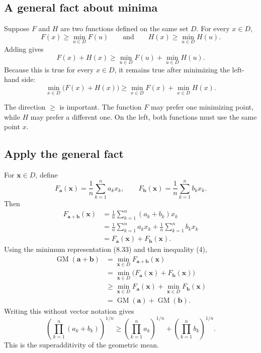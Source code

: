 \documentclass[11pt]{article}
\newcommand{\GM}{\operatorname{GM}}
\begin{document}
\subsection{A general fact about minima}

Suppose $F$ and $H$ are two functions defined on the same set $D$.  For every
$x\in D$,
\[
 F(x)\ge\min_{u\in D}F(u)
 \qquad\text{and}\qquad
 H(x)\ge\min_{u\in D}H(u).
\]
Adding gives
\[
 F(x)+H(x)
 \ge
 \min_{u\in D}F(u)+\min_{u\in D}H(u).
\]
Because this is true for every $x\in D$, it remains true after minimizing the
left-hand side:
\begin{equation*}
\boxed{
 \min_{x\in D}\bigl(F(x)+H(x)\bigr)
 \ge
 \min_{x\in D}F(x)+\min_{x\in D}H(x).
}
\tag{4}
\end{equation*}

The direction $\ge$ is important.  The function $F$ may prefer one minimizing
point, while $H$ may prefer a different one.  On the left, both functions must
use the same point $x$.

\subsection{Apply the general fact}

For $\mathbf x\in D$, define
\[
 F_{\mathbf a}(\mathbf x)
 =\frac1n\sum_{k=1}^{n}a_kx_k,
 \qquad
 F_{\mathbf b}(\mathbf x)
 =\frac1n\sum_{k=1}^{n}b_kx_k.
\]
Then
\begin{align*}
 F_{\mathbf a+\mathbf b}(\mathbf x)
 &=\frac1n\sum_{k=1}^{n}(a_k+b_k)x_k\\
 &=\frac1n\sum_{k=1}^{n}a_kx_k
   +\frac1n\sum_{k=1}^{n}b_kx_k\\
 &=F_{\mathbf a}(\mathbf x)+F_{\mathbf b}(\mathbf x).
\end{align*}
Using the minimum representation (8.33) and then inequality (4),
\begin{align*}
 \GM(\mathbf a+\mathbf b)
 &=\min_{\mathbf x\in D}
   F_{\mathbf a+\mathbf b}(\mathbf x)\\
 &=\min_{\mathbf x\in D}
   \bigl(F_{\mathbf a}(\mathbf x)+F_{\mathbf b}(\mathbf x)\bigr)\\
 &\ge
   \min_{\mathbf x\in D}F_{\mathbf a}(\mathbf x)
   +
   \min_{\mathbf x\in D}F_{\mathbf b}(\mathbf x)\\
 &=\GM(\mathbf a)+\GM(\mathbf b).
\end{align*}
Writing this without vector notation gives
\[
 \boxed{
 \left(\prod_{k=1}^{n}(a_k+b_k)\right)^{1/n}
 \ge
 \left(\prod_{k=1}^{n}a_k\right)^{1/n}
 +
 \left(\prod_{k=1}^{n}b_k\right)^{1/n}.
 }
\]
This is the superadditivity of the geometric mean.
\end{document}

